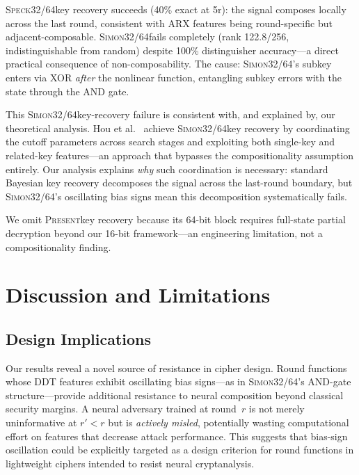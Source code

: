 \documentclass[runningheads]{llncs}
\newcommand{\speck}{\textsc{Speck32/64}}
\newcommand{\simon}{\textsc{Simon32/64}}
\newcommand{\present}{\textsc{Present}}
\begin{document}
\speck key recovery succeeds (40\% exact at 5r): the signal composes locally across the last round, consistent with ARX features being round-specific but adjacent-composable.
\simon fails completely (rank 122.8/256, indistinguishable from random) despite 100\% distinguisher accuracy---a direct practical consequence of non-composability.
The cause: \simon's subkey enters via XOR \emph{after} the nonlinear function, entangling subkey errors with the state through the AND gate.

This \simon key-recovery failure is consistent with, and explained by, our theoretical analysis.
Hou et al.~\cite{hou2025bayesian} achieve \simon key recovery by coordinating the cutoff parameters across search stages and exploiting both single-key and related-key features---an approach that bypasses the compositionality assumption entirely.
Our analysis explains \emph{why} such coordination is necessary: standard Bayesian key recovery decomposes the signal across the last-round boundary, but \simon's oscillating bias signs mean this decomposition systematically fails.

We omit \present key recovery because its 64-bit block requires full-state partial decryption beyond our 16-bit framework---an engineering limitation, not a compositionality finding.


\section{Discussion and Limitations}
\label{sec:discussion}

\subsection{Design Implications}

Our results reveal a novel source of resistance in cipher design.
Round functions whose DDT features exhibit oscillating bias signs---as in \simon's AND-gate structure---provide additional resistance to neural composition beyond classical security margins.
A neural adversary trained at round~$r$ is not merely uninformative at $r' < r$ but is \emph{actively misled}, potentially wasting computational effort on features that decrease attack performance.
This suggests that bias-sign oscillation could be explicitly targeted as a design criterion for round functions in lightweight ciphers intended to resist neural cryptanalysis.
\end{document}

